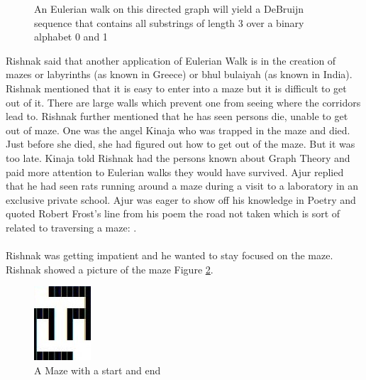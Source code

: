 \begin{figure}
\begin{center}
\caption{ An Eulerian walk on this directed graph will yield a DeBruijn sequence that contains all substrings of length 3 over a binary alphabet 0 and 1}\label{4g6}
\end{center}
\end{figure}
\vspace{0.3in}
\noindent
Rishnak said that another application of Eulerian Walk is in the creation of mazes or labyrinths (as known in Greece) or bhul bulaiyah (as known in India).  Rishnak mentioned that it is easy to enter into a maze but it is difficult to get out of it. There are large walls which prevent one from seeing where the corridors lead to. Rishnak further mentioned that he has seen persons die, unable to get out of maze. One was the angel Kinaja who was trapped in the maze and died. Just before she died, she had figured out how to get out of the maze. But it was too late. Kinaja told Rishnak had the persons known about Graph Theory and paid more attention to Eulerian walks they would have survived. Ajur replied that he had seen rats running around a maze during a visit to a laboratory in an exclusive private school. Ajur was eager to show off his knowledge in Poetry and quoted Robert Frost's line from his poem the road not taken which is sort of related to traversing a maze: . 
\\
\\
\noindent Rishnak was getting impatient and he wanted to stay focused on the maze. Rishnak showed a picture of the maze Figure \ref{4g7}.
\begin{figure}
\begin{center}
\includegraphics{maze1.JPG}
\caption{A Maze with a start and end}\label{4g7}
\end{center}
\end{figure}

